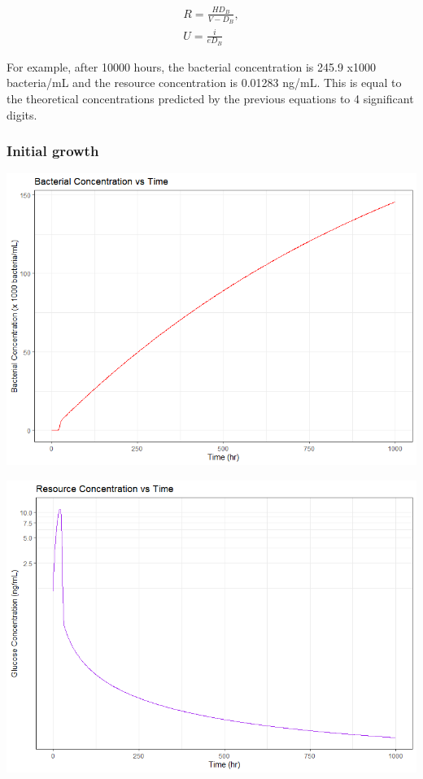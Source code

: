 \documentclass{article}
\begin{document}
\begin{equation}
\begin{split}
R = \frac{HD_B}{V - D_B}, \\ U = \frac{i}{eD_B}
\end{split}
\end{equation}



For example, after 10000 hours, the bacterial concentration is 245.9 x1000 bacteria/mL and the resource concentration is 0.01283 ng/mL. This is equal to the theoretical concentrations predicted by the previous equations to 4 significant digits.

\subsubsection{Initial growth}
\includegraphics[scale=0.5]{plots/NoPhage_U_zoomed.png}

\includegraphics[scale=0.5]{plots/NoPhage_R_zoomed.png}
\end{document}
